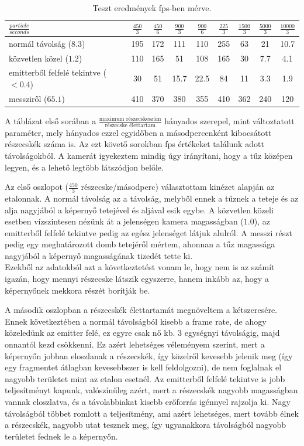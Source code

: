 \begin{table}[h!]
\centering
\begin{tabular}{ m{10em}|c|c|c|c|c|c|c|c| } 
 $\frac{particle}{seconds}$ & $\frac{450}{3}$ & $\frac{450}{6}$ & $\frac{900}{3}$ & $\frac{900}{6}$ & $\frac{225}{3}$ & $\frac{1500}{3}$ & $\frac{5000}{3}$ & $\frac{10000}{3}$ \\  \hline
 
 normál távolság ($8.3$) & 195 & 172 & 111 & 110 & 255 & 63 & 21 & 10.7\\  \hline
 közvetlen közel ($1.2$) & 110 & 165 & 51 & 108 & 165 & 30 & 7.7 & 4.1\\  \hline
 emitterből felfelé tekintve ($<0.4$) & 30 &  51 & 15.7 & 22.5 & 84 & 11 & 3.3 & 1.9\\ \hline
 messziről ($65.1$) & 410 &  370 & 380 & 355 & 410 & 362 & 240 & 120\\ 
 \hline
\end{tabular}
\caption{Teszt eredmények fps-ben mérve.}
\label{table:1}
\end{table}

A táblázat első sorában a $\frac{\text{maximum részecskeszám}}{\text{részecske élettartam}}$ hányados szerepel, mint változtatott paraméter, mely hányados ezzel egyidőben a másodpercenként kibocsátott részecskék száma is. Az ezt követő sorokban fps értékeket találunk adott távolságokból. A kamerát igyekeztem mindig úgy irányítani, hogy a tűz középen legyen, és a lehető legtöbb látszódjon belőle.

Az első oszlopot ($\frac{450}{3}$ részecske/másodperc) választottam kinézet alapján az etalonnak. A normál távolság az a távolság, melyből ennek a tűznek a teteje és az alja nagyjából a képernyő tetejével és aljával esik egybe. A közvetlen közeli esetben vízszintesen nézünk át a jelenségen kamera magasságban ($1.0$), az emitterből felfelé tekintve pedig az egész jelenséget látjuk alulról. A messzi részt pedig egy meghatározott domb tetejéről mértem, ahonnan a tűz magassága nagyjából a képernyő magasságának tizedét tette ki.\\
Ezekből az adatokból azt a következtetést vonam le, hogy nem is az számít igazán, hogy mennyi részecske látszik egyszerre, hanem inkább az, hogy a képernyőnek mekkora részét borítják be.

A második oszlopban a részecskék élettartamát megnöveltem a kétszeresére. Ennek következtében a normál távolságból kisebb a frame rate, de ahogy közeledünk az emitter felé, ez egyre csak nő kb. 3 egységnyi távolságig, majd onnantól kezd csökkenni. Ez azért lehetséges véleményem szerint, mert a képernyőn jobban eloszlanak a részecskék, így közelről kevesebb jelenik meg (így egy fragmentet átlagban kevesebbszer is kell feldolgozni), de nem foglalnak el nagyobb területet mint az etalon esetnél. Az emitterből felfelé tekintve is jobb teljesítményt kapunk, valószínűleg azért, mert a részecskék nagyobb magasságban vannak eloszlatva, és a távolabbiakat kisebb erőforrás igénnyel rajzolja ki. Nagy távolságból többet romlott a teljesítmény, ami azért lehetséges, mert tovább élnek a részecskék, nagyobb utat tesznek meg, így ugyanakkora távolságból nagyobb területet fednek le a képernyőn.

